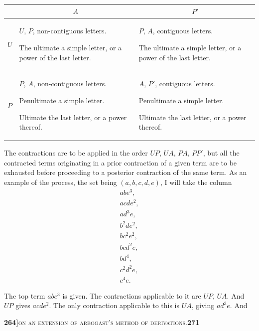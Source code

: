 \documentclass[11pt]{article}
\begin{document}
\medskip

\noindent
\renewcommand{\arraystretch}{1.35}
\begin{tabular}{|m{0.45in}|m{2.2in}|m{2.2in}|}
\hline
& \multicolumn{1}{c|}{$A$} & \multicolumn{1}{c|}{$P'$}\\
\hline
$U$ & $U$, $P$, non-contiguous letters.\par The ultimate a simple letter, or a power of the last letter. & $P$, $A$, contiguous letters.\par The ultimate a simple letter, or a power of the last letter.\\
\hline
$P$ & $P$, $A$, non-contiguous letters.\par Penultimate a simple letter.\par Ultimate the last letter, or a power thereof. & $A$, $P'$, contiguous letters.\par Penultimate a simple letter.\par Ultimate the last letter, or a power thereof.\\
\hline
\end{tabular}

\medskip

\noindent The contractions are to be applied in the order $UP$, $UA$, $PA$, $PP'$, but all the contracted terms originating in a prior contraction of a given term are to be exhausted before proceeding to a posterior contraction of the same term. As an example of the process, the set being $(a, b, c, d, e)$, I will take the column
\[
\begin{array}{l}
   a b e^3,\\
   a c d e^2,\\
   a d^3 e,\\
   b^2 d e^2,\\
   b c^2 e^2,\\
   b c d^2 e,\\
   b d^4,\\
   c^2 d^2 e,\\
   c^4 e.
\end{array}
\]

\medskip

\noindent The top term $a b e^3$ is given. The contractions applicable to it are $UP$, $UA$. And $UP$ gives $a c d e^2$. The only contraction applicable to this is $UA$, giving $a d^3 e$. And

\newpage
\setcounter{page}{271}

\noindent\textbf{264]}\hfill\textsc{on an extension of arbogast's method of derivations.}\hfill\textbf{271}
\end{document}
